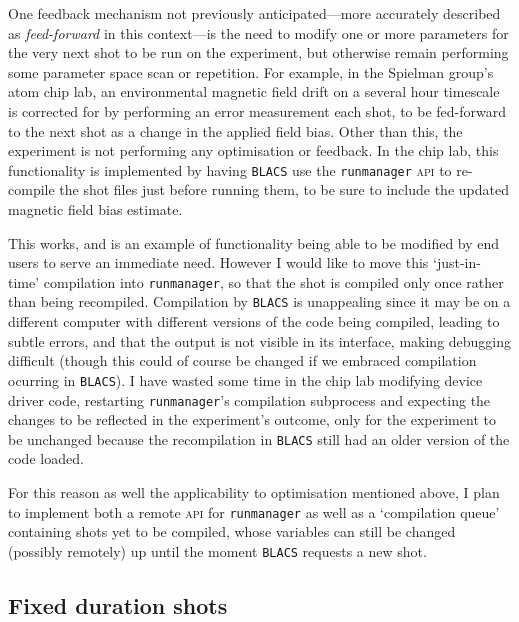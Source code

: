 One feedback mechanism not previously anticipated---more accurately described as \emph{feed-forward} in this context---is the need to modify one or more parameters for the very next shot to be run on the experiment, but otherwise remain performing some parameter space scan or repetition. For example, in the Spielman group's atom chip lab, an environmental magnetic field drift on a several hour timescale is corrected for by performing an error measurement each shot, to be fed-forward to the next shot as a change in the applied field bias. Other than this, the experiment is not performing any optimisation or feedback. In the chip lab, this functionality is implemented by having \texttt{BLACS} use the \texttt{runmanager} \textsc{api} to re-compile the shot files just before running them, to be sure to include the updated magnetic field bias estimate. 

This works, and is an example of functionality being able to be modified by end users to serve an immediate need. However I would like to move this `just-in-time' compilation into \texttt{runmanager}, so that the shot is compiled only once rather than being recompiled. Compilation by \texttt{BLACS} is unappealing since it may be on a different computer with different versions of the code being compiled, leading to subtle errors, and that the output is not visible in its interface, making debugging difficult (though this could of course be changed if we embraced compilation ocurring in \texttt{BLACS}). I have wasted some time in the chip lab modifying device driver code, restarting \texttt{runmanager}'s compilation subprocess  and expecting the changes to be reflected in the experiment's outcome, only for the experiment to be unchanged because the recompilation in \texttt{BLACS} still had an older version of the code loaded.

For this reason as well the applicability to optimisation mentioned above, I plan to implement both a remote \textsc{api} for \texttt{runmanager} as well as a `compilation queue' containing shots yet to be compiled, whose variables can still be changed (possibly remotely) up until the moment \texttt{BLACS} requests a new shot.

\subsection{Fixed duration shots}

